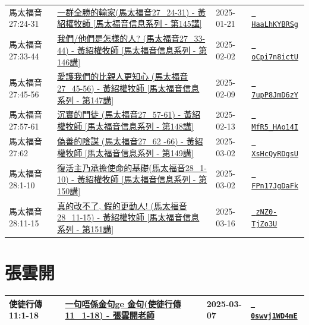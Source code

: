 \documentclass{book}
\begin{document}
{\begin{xltabular}{\textwidth}{|p{0.15\textwidth} p{0.6\textwidth}|p{0.07\textwidth} p{0.1\textwidth}|}
馬太福音 27:24-31 & \hyperref[sec:HaaLhKYBRSg]{一群全勝的輸家(馬太福音27\_24-31) - 黃紹權牧師  [馬太福音信息系列 - 第145講]} & 2025-01-21 & \href{https://youtube.com/watch?v=HaaLhKYBRSg}{\texttt{ HaaLhKYBRSg}} \\
馬太福音 27:33-44 & \hyperref[sec:oCpi7n8ictU]{我們/他們是怎樣的人? (馬太福音27\_33-44) - 黃紹權牧師  [馬太福音信息系列 - 第146講]} & 2025-02-02 & \href{https://youtube.com/watch?v=oCpi7n8ictU}{\texttt{ oCpi7n8ictU}} \\
馬太福音 27:45-56 & \hyperref[sec:7upP8JmD6zY]{愛護我們的比親人更知心 (馬太福音27\_45-56) - 黃紹權牧師  [馬太福音信息系列 - 第147講]} & 2025-02-09 & \href{https://youtube.com/watch?v=7upP8JmD6zY}{\texttt{ 7upP8JmD6zY}} \\
馬太福音 27:57-61 & \hyperref[sec:MfR5_HAo14I]{沉實的門徒  (馬太福音27\_57-61) - 黃紹權牧師  [馬太福音信息系列 - 第148講]} & 2025-02-13 & \href{https://youtube.com/watch?v=MfR5_HAo14I}{\texttt{ MfR5\_HAo14I}} \\
馬太福音 27:62 & \hyperref[sec:XsHcQyRDgsU]{偽善的陰謀 (馬太福音27\_62 -66) - 黃紹權牧師  [馬太福音信息系列 - 第149講]} & 2025-03-02 & \href{https://youtube.com/watch?v=XsHcQyRDgsU}{\texttt{ XsHcQyRDgsU}} \\
馬太福音 28:1-10 & \hyperref[sec:FPn17JgDaFk]{復活主乃承擔使命的基礎(馬太福音28\_1-10) - 黃紹權牧師  [馬太福音信息系列 - 第150講]} & 2025-03-02 & \href{https://youtube.com/watch?v=FPn17JgDaFk}{\texttt{ FPn17JgDaFk}} \\
馬太福音 28:11-15 & \hyperref[sec:zNZ0_TjZo3U]{真的改不了, 假的更動人! (馬太福音28\_11-15) - 黃紹權牧師  [馬太福音信息系列 - 第151講]} & 2025-03-16 & \href{https://youtube.com/watch?v=zNZ0-TjZo3U}{\texttt{ zNZ0-TjZo3U}} \\
\end{xltabular}
}


\chapter{張雲開}\label{ch:preacher1}
\begin{multicols}{3}
\minitoc
\end{multicols}
{ \scriptsize


\begin{xltabular}{\textwidth}{|p{0.15\textwidth} p{0.6\textwidth}|p{0.07\textwidth} p{0.1\textwidth}|}
\hline
使徒行傳 11:1-18 & \hyperref[sec:0swvj1WD4mE]{一句唔係金句ge 金句(使徒行傳11\_1-18) - 張雲開老師} & 2025-03-07 & \href{https://youtube.com/watch?v=0swvj1WD4mE}{\texttt{ 0swvj1WD4mE}} \\
\hline
\end{xltabular}
}
\newpage
\end{document}
